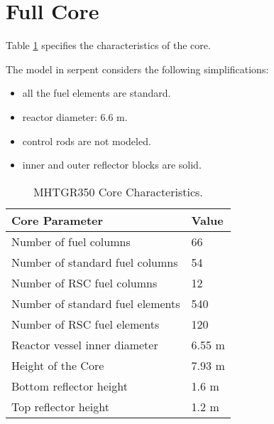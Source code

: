 \documentclass[11pt,letterpaper]{article}
\begin{document}
\section{Full Core}

Table \ref{tab:ccharacteristics} specifies the characteristics of the core.

The model in serpent considers the following simplifications:
\begin{itemize}
	\item all the fuel elements are standard.
	\item reactor diameter: 6.6 m.
    \item control rods are not modeled.
	\item inner and outer reflector blocks are solid.
\end{itemize}

	\begin{table}[H]
		\centering
	    \caption{MHTGR350 Core Characteristics.}
	    \label{tab:ccharacteristics}
		\begin{tabular}{l|l}
		\hline
		Core Parameter                   & Value     \\ \hline
		Number of fuel columns           & 66        \\
		Number of standard fuel columns  & 54        \\
		Number of RSC fuel columns       & 12        \\
		Number of standard fuel elements & 540       \\
		Number of RSC fuel elements      & 120       \\
		Reactor vessel inner diameter    & 6.55 m    \\
		Height of the Core               & 7.93 m    \\
		Bottom reflector height          & 1.6 m     \\
		Top reflector height             & 1.2 m     \\ \hline
		\end{tabular}
	\end{table}


\pagebreak


\end{document}
